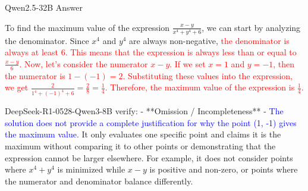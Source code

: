 \begin{answerbox}{Qwen2.5-32B Answer}

To find the maximum value of the expression \(\frac{x - y}{x^4 + y^4 + 6}\), we can start by analyzing the denominator. Since \(x^4\) and \(y^4\) are always non-negative, \textcolor{red}{the denominator is always at least 6. This means that the expression is always less than or equal to \(\frac{x - y}{6}\). Now, let's consider the numerator \(x - y\). If we set \(x = 1\) and \(y = -1\), then the numerator is \(1 - (-1) = 2\). Substituting these values into the expression, we get \(\frac{2}{1^4 + (-1)^4 + 6} = \frac{2}{8} = \frac{1}{4}\). Therefore, the maximum value of the expression is \(\boxed{\frac{1}{4}}\).}
\begin{tcolorbox}[
    colback=blue!5!white,         %
    colframe=blue!40!white,       %
]
DeepSeek-R1-0528-Qwen3-8B verify:  - **Omission / Incompleteness** - \textcolor{blue}{The solution does not provide a complete justification for why the point (1, -1) gives the maximum value}. It only evaluates one specific point and claims it is the maximum without comparing it to other points or demonstrating that the expression cannot be larger elsewhere. For example, it does not consider points where \(x^4 + y^4\) is minimized while \(x - y\) is positive and non-zero, or points where the numerator and denominator balance differently.


\end{tcolorbox}

\end{answerbox}